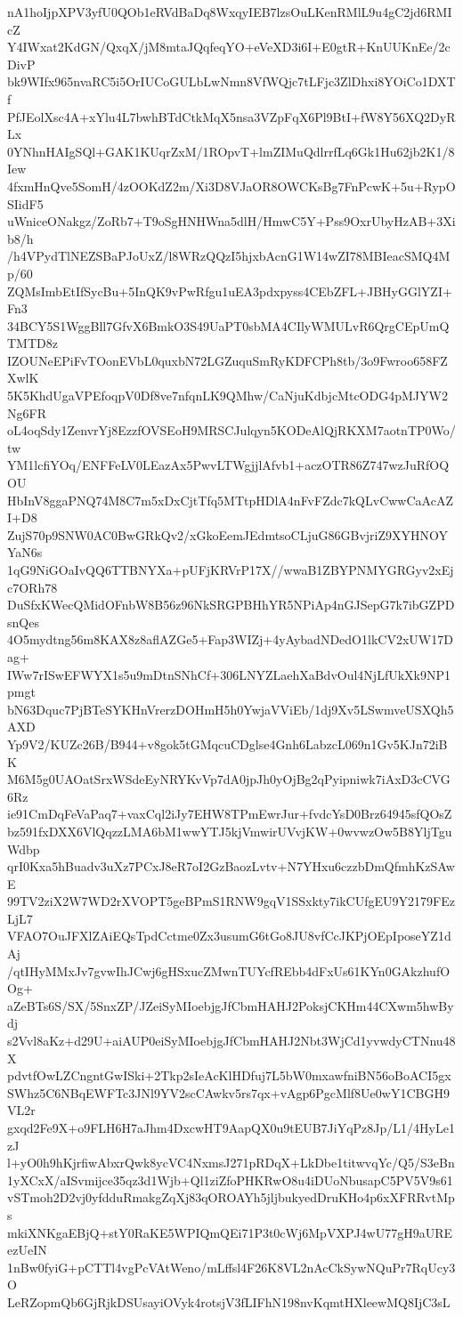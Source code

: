 nA1hoIjpXPV3yfU0QOb1eRVdBaDq8WxqyIEB7lzsOuLKenRMlL9u4gC2jd6RMIcZ
Y4IWxat2KdGN/QxqX/jM8mtaJQqfeqYO+eVeXD3i6I+E0gtR+KnUUKnEe/2cDivP
bk9WIfx965nvaRC5i5OrIUCoGULbLwNmn8VfWQjc7tLFjc3ZlDhxi8YOiCo1DXTf
PfJEolXsc4A+xYlu4L7bwhBTdCtkMqX5nsa3VZpFqX6Pl9BtI+fW8Y56XQ2DyRLx
0YNhnHAIgSQl+GAK1KUqrZxM/1ROpvT+lmZIMuQdlrrfLq6Gk1Hu62jb2K1/8Iew
4fxmHnQve5SomH/4zOOKdZ2m/Xi3D8VJaOR8OWCKsBg7FnPcwK+5u+RypOSIidF5
uWniceONakgz/ZoRb7+T9oSgHNHWna5dlH/HmwC5Y+Pss9OxrUbyHzAB+3Xib8/h
/h4VPydTlNEZSBaPJoUxZ/l8WRzQQzI5hjxbAcnG1W14wZI78MBIeacSMQ4Mp/60
ZQMsImbEtIfSycBu+5InQK9vPwRfgu1uEA3pdxpyss4CEbZFL+JBHyGGlYZI+Fn3
34BCY5S1WggBll7GfvX6BmkO3S49UaPT0sbMA4CIlyWMULvR6QrgCEpUmQTMTD8z
IZOUNeEPiFvTOonEVbL0quxbN72LGZuquSmRyKDFCPh8tb/3o9Fwroo658FZXwlK
5K5KhdUgaVPEfoqpV0Df8ve7nfqnLK9QMhw/CaNjuKdbjcMtcODG4pMJYW2Ng6FR
oL4oqSdy1ZenvrYj8EzzfOVSEoH9MRSCJulqyn5KODeAlQjRKXM7aotnTP0Wo/tw
YM1lcfiYOq/ENFFeLV0LEazAx5PwvLTWgjjlAfvb1+aczOTR86Z747wzJuRfOQOU
HbInV8ggaPNQ74M8C7m5xDxCjtTfq5MTtpHDlA4nFvFZdc7kQLvCwwCaAcAZI+D8
ZujS70p9SNW0AC0BwGRkQv2/xGkoEemJEdmtsoCLjuG86GBvjriZ9XYHNOYYaN6s
1qG9NiGOaIvQQ6TTBNYXa+pUFjKRVrP17X//wwaB1ZBYPNMYGRGyv2xEjc7ORh78
DuSfxKWecQMidOFnbW8B56z96NkSRGPBHhYR5NPiAp4nGJSepG7k7ibGZPDsnQes
4O5mydtng56m8KAX8z8aflAZGe5+Fap3WIZj+4yAybadNDedO1lkCV2xUW17Dag+
IWw7rISwEFWYX1s5u9mDtnSNhCf+306LNYZLaehXaBdvOul4NjLfUkXk9NP1pmgt
bN63Dquc7PjBTeSYKHnVrerzDOHmH5h0YwjaVViEb/1dj9Xv5LSwmveUSXQh5AXD
Yp9V2/KUZc26B/B944+v8gok5tGMqcuCDglse4Gnh6LabzcL069n1Gv5KJn72iBK
M6M5g0UAOatSrxWSdeEyNRYKvVp7dA0jpJh0yOjBg2qPyipniwk7iAxD3cCVG6Rz
ie91CmDqFeVaPaq7+vaxCql2iJy7EHW8TPmEwrJur+fvdcYsD0Brz64945sfQOsZ
bz591fxDXX6VlQqzzLMA6bM1wwYTJ5kjVmwirUVvjKW+0wvwzOw5B8YljTguWdbp
qrI0Kxa5hBuadv3uXz7PCxJ8eR7oI2GzBaozLvtv+N7YHxu6czzbDmQfmhKzSAwE
99TV2ziX2W7WD2rXVOPT5geBPmS1RNW9gqV1SSxkty7ikCUfgEU9Y2179FEzLjL7
VFAO7OuJFXlZAiEQsTpdCctme0Zx3usumG6tGo8JU8vfCcJKPjOEpIposeYZ1dAj
/qtIHyMMxJv7gvwIhJCwj6gHSxucZMwnTUYcfREbb4dFxUs61KYn0GAkzhufOOg+
aZeBTs6S/SX/5SnxZP/JZeiSyMIoebjgJfCbmHAHJ2PoksjCKHm44CXwm5hwBydj
s2Vvl8aKz+d29U+aiAUP0eiSyMIoebjgJfCbmHAHJ2Nbt3WjCd1yvwdyCTNnu48X
pdvtfOwLZCngntGwISki+2Tkp2sIeAcKlHDfuj7L5bW0mxawfniBN56oBoACI5gx
SWhz5C6NBqEWFTc3JNl9YV2scCAwkv5rs7qx+vAgp6PgcMlf8Ue0wY1CBGH9VL2r
gxqd2Fe9X+o9FLH6H7aJhm4DxcwHT9AapQX0u9tEUB7JiYqPz8Jp/L1/4HyLe1zJ
l+yO0h9hKjrfiwAbxrQwk8ycVC4NxmsJ271pRDqX+LkDbe1titwvqYc/Q5/S3eBn
1yXCxX/aISvmijce35qz3d1Wjb+Ql1ziZfoPHKRwO8u4iDUoNbusapC5PV5V9s61
vSTmoh2D2vj0yfdduRmakgZqXj83qOROAYh5jljbukyedDruKHo4p6xXFRRvtMps
mkiXNKgaEBjQ+stY0RaKE5WPIQmQEi71P3t0cWj6MpVXPJ4wU77gH9aUREezUeIN
1nBw0fyiG+pCTTl4vgPcVAtWeno/mLffsl4F26K8VL2nAcCkSywNQuPr7RqUcy3O
LeRZopmQb6GjRjkDSUsayiOVyk4rotsjV3fLIFhN198nvKqmtHXleewMQ8IjC3sL
